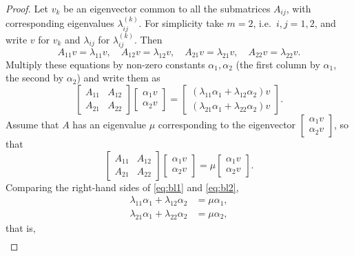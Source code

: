 \documentclass[11pt,a4paper]{article}
\numberwithin{equation}{section}
\theoremstyle{spacedplain}
\theoremstyle{spaceddefinition}
\theoremstyle{spacedremark}
\begin{document}
\begin{proof}
Let \(v_k\) be an eigenvector common to all the submatrices
\(A_{ij}\), with corresponding eigenvalues
\(\lambda_{ij}^{(k)}\).  For simplicity take \(m=2\), i.e.\
\(i,j=1,2\), and write \(v\) for \(v_k\) and \(\lambda_{ij}\) for
\(\lambda_{ij}^{(k)}\).  Then
\[
  A_{11}v=\lambda_{11}v,\quad A_{12}v=\lambda_{12}v,\quad
  A_{21}v=\lambda_{21}v,\quad A_{22}v=\lambda_{22}v .
\]
Multiply these equations by non-zero constants \(\alpha_1,\alpha_2\)
(the first column by \(\alpha_1\), the second by \(\alpha_2\)) and
write them as
\begin{equation}\label{eq:bl1}
  \begin{bmatrix}A_{11}&A_{12}\\ A_{21}&A_{22}\end{bmatrix}
  \begin{bmatrix}\alpha_1v\\ \alpha_2v\end{bmatrix}
  =\begin{bmatrix}(\lambda_{11}\alpha_1+\lambda_{12}\alpha_2)v\\
     (\lambda_{21}\alpha_1+\lambda_{22}\alpha_2)v\end{bmatrix}.
\end{equation}
Assume that \(A\) has an eigenvalue \(\mu\) corresponding to the
eigenvector \(\begin{bmatrix}\alpha_1v\\ \alpha_2v\end{bmatrix}\), so
that
\begin{equation}\label{eq:bl2}
  \begin{bmatrix}A_{11}&A_{12}\\ A_{21}&A_{22}\end{bmatrix}
  \begin{bmatrix}\alpha_1v\\ \alpha_2v\end{bmatrix}
  =\mu\begin{bmatrix}\alpha_1v\\ \alpha_2v\end{bmatrix}.
\end{equation}
Comparing the right-hand sides of \eqref{eq:bl1} and \eqref{eq:bl2},
\begin{align*}
  \lambda_{11}\alpha_1+\lambda_{12}\alpha_2&=\mu\alpha_1,\\
  \lambda_{21}\alpha_1+\lambda_{22}\alpha_2&=\mu\alpha_2,
\end{align*}
that is,
\begin{align*}

\end{align*}
\end{proof}
\end{document}
